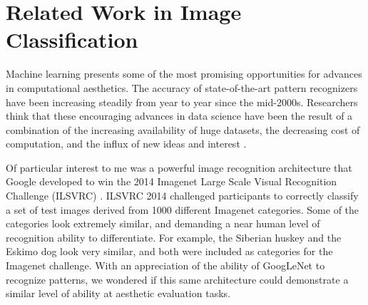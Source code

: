 \documentclass[midd]{thesis}
\begin{document}

\section{Related Work in Image Classification}

Machine learning presents some of the most promising opportunities for advances in computational aesthetics. The accuracy of state-of-the-art pattern recognizers have been increasing steadily from year to year since the mid-2000s. Researchers think that these encouraging advances in data science have been the result of a combination of the increasing availability of huge datasets, the decreasing cost of computation, and the influx of new ideas and interest \cite{szegedy2014going}.

Of particular interest to me was a powerful image recognition architecture that Google developed to win the 2014 Imagenet Large Scale Visual Recognition Challenge (ILSVRC)  \cite{szegedy2014going}. ILSVRC 2014 challenged participants to correctly classify a set of test images derived from 1000 different Imagenet categories. Some of the categories look extremely similar, and demanding a near human level of recognition ability to differentiate. For example, the Siberian huskey and the Eskimo dog look very similar, and both were included as categories for the Imagenet challenge. With an appreciation of the ability of GoogLeNet to recognize patterns, we wondered if this same architecture could demonstrate a similar level of ability at aesthetic evaluation tasks.

\end{document}
